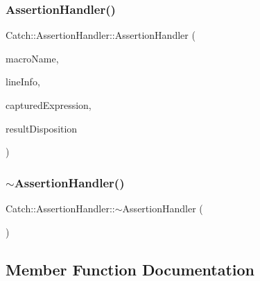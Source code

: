 \subsubsection{\texorpdfstring{AssertionHandler()}{AssertionHandler()}}
{\footnotesize\ttfamily Catch\+::\+Assertion\+Handler\+::\+Assertion\+Handler (\begin{DoxyParamCaption}\item[{\mbox{\hyperlink{class_catch_1_1_string_ref}{String\+Ref}} const \&}]{macro\+Name,  }\item[{\mbox{\hyperlink{struct_catch_1_1_source_line_info}{Source\+Line\+Info}} const \&}]{line\+Info,  }\item[{\mbox{\hyperlink{class_catch_1_1_string_ref}{String\+Ref}}}]{captured\+Expression,  }\item[{\mbox{\hyperlink{struct_catch_1_1_result_disposition_a3396cad6e2259af326b3aae93e23e9d8}{Result\+Disposition\+::\+Flags}}}]{result\+Disposition }\end{DoxyParamCaption})}

\mbox{\label{class_catch_1_1_assertion_handler_a1e839d810f6ac0fa6d127fe8350175ed}} 
\subsubsection{\texorpdfstring{$\sim$AssertionHandler()}{~AssertionHandler()}}
{\footnotesize\ttfamily Catch\+::\+Assertion\+Handler\+::$\sim$\+Assertion\+Handler (\begin{DoxyParamCaption}{ }\end{DoxyParamCaption})\hspace{0.3cm}{\ttfamily [inline]}}



\subsection{Member Function Documentation}
\mbox{\label{class_catch_1_1_assertion_handler_a193bb3999494c46457f3059184c6b251}} 
